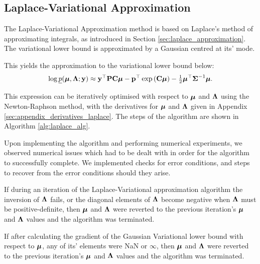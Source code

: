 	\subsection{Laplace-Variational Approximation}
	The Laplace-Variational Approximation method is based on Laplace's method of approximating integrals, as
	introduced in Section \ref{sec:laplace_approximation}. The variational lower bound  is approximated by a
	Gaussian centred at its' mode.

	This yields the approximation to the variational lower bound below:
	\begin{align*}
		\log \underline{p}({\boldsymbol \mu}, {\boldsymbol \Lambda}; {\bf y}) \approx {\bf y}^\top{\bf P}{\bf C}{\boldsymbol\mu} - {\bf p}^\top\exp \left ({\bf C} {\boldsymbol \mu} \right ) - \tfrac{1}{2} {\boldsymbol \mu}^\top {\boldsymbol\Sigma}^{-1} {\boldsymbol \mu}. 
	\end{align*}
			
	\noindent This expression can be iteratively optimised with respect to ${\boldsymbol \mu}$ and ${\boldsymbol \Lambda}$ using the
	Newton-Raphson method, with the derivatives for ${\boldsymbol \mu}$ and ${\boldsymbol \Lambda}$ given in Appendix
	\ref{sec:appendix_derivatives_laplace}. The steps of the algorithm are shown in Algorithm \ref{alg:laplace_alg}.
			
	Upon implementing the algorithm and performing numerical experiments, we observed numerical issues which had to be dealt with in 
	order for the algorithm to successfully complete.
	We implemented checks for error conditions, and steps to recover from the error conditions should
	they arise.

	If during an iteration of the Laplace-Variational approximation algorithm the inversion  of ${\boldsymbol \Lambda}$
	fails, or the diagonal elements of ${\boldsymbol \Lambda}$ become negative when ${\boldsymbol \Lambda}$ must be positive-definite,
	then ${\boldsymbol \mu}$ and ${\boldsymbol \Lambda}$ were reverted to the previous iteration's ${\boldsymbol \mu}$ and ${\boldsymbol \Lambda}$ values and
	the algorithm was terminated.

	If after calculating the gradient of the Gaussian Variational lower bound with respect to ${\boldsymbol \mu}$, any of
	its' elements were NaN or $\infty$, then ${\boldsymbol \mu}$ and ${\boldsymbol \Lambda}$ were reverted to the previous iteration's
	${\boldsymbol \mu}$ and ${\boldsymbol \Lambda}$ values and the algorithm was terminated.
			
